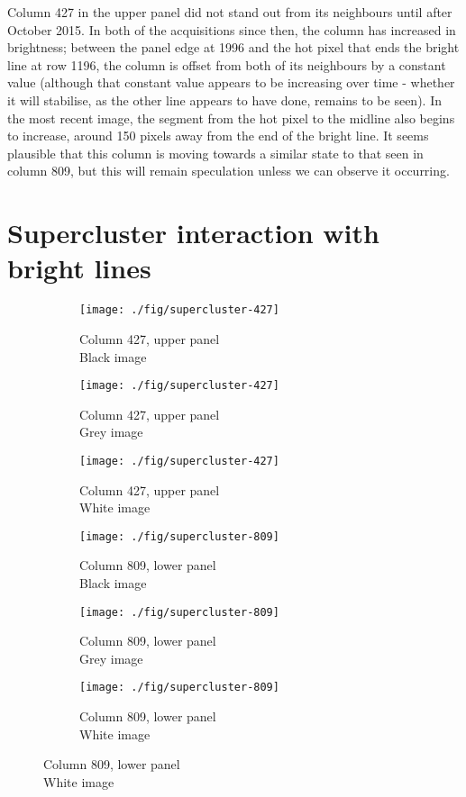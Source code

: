 \documentclass[10pt,fleqn]{article}
\begin{document}
Column 427 in the upper panel did not stand out from its neighbours until after October 2015. In both of the acquisitions since then, the column has increased in brightness; between the panel edge at 1996 and the hot pixel that ends the bright line at row 1196, the column is offset from both of its neighbours by a constant value (although that constant value appears to be increasing over time - whether it will stabilise, as the other line appears to have done, remains to be seen). In the most recent image, the segment from the hot pixel to the midline also begins to increase, around 150 pixels away from the end of the bright line. It seems plausible that this column is moving towards a similar state to that seen in column 809, but this will remain speculation unless we can observe it occurring.

\clearpage
\section{Supercluster interaction with bright lines}

\begin{figure}[!ht] %
\caption{Ends of bright lines with identified bad pixels marked.}
\centering
%
\begin{subfigure}[t]{0.32\textwidth}
\caption{Column 427, upper panel\\ Black image}
\texttt{[image: ./fig/supercluster-427]}
\end{subfigure}
%
\begin{subfigure}[t]{0.32\textwidth}
\caption{Column 427, upper panel\\ Grey image}
\texttt{[image: ./fig/supercluster-427]}
\end{subfigure}
%
\begin{subfigure}[t]{0.32\textwidth}
\caption{Column 427, upper panel\\ White image}
\texttt{[image: ./fig/supercluster-427]}
\end{subfigure}
%
%
%
\begin{subfigure}[t]{0.32\textwidth}
\caption{Column 809, lower panel\\ Black image}
\texttt{[image: ./fig/supercluster-809]}
\end{subfigure}
%
\begin{subfigure}[t]{0.32\textwidth}
\caption{Column 809, lower panel\\ Grey image}
\texttt{[image: ./fig/supercluster-809]}
\end{subfigure}
%
\begin{subfigure}[t]{0.32\textwidth}
\caption{Column 809, lower panel\\ White image}
\texttt{[image: ./fig/supercluster-809]}
\end{subfigure}
%
\end{figure}
\end{document}
